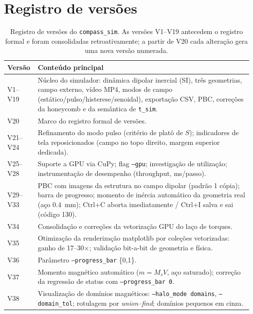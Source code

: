 \documentclass[11pt,a4paper]{article}
\newcommand{\code}[1]{\texttt{#1}}
\begin{document}
\section{Registro de versões}

\begin{table}[h]
\centering
\small
\caption{Registro de versões do \code{compass\_sim}. As versões V1--V19
antecedem o registro formal e foram consolidadas retroativamente; a
partir de V20 cada alteração gera uma nova versão numerada.}
\label{tab:versoes}
\begin{tabular}{@{}lp{11.5cm}@{}}
\toprule
\textbf{Versão} & \textbf{Conteúdo principal} \\
\midrule
V1--V19 & Núcleo do simulador: dinâmica dipolar inercial (SI), três
geometrias, campo externo, vídeo MP4, modos de campo
(estático/pulso/histerese/senoidal), exportação CSV, PBC, correções da
honeycomb e da semântica de \code{t\_sim}. \\
V20 & Marco do registro formal de versões. \\
V21--V24 & Refinamento do modo pulso (critério de platô de $S$);
indicadores de tela reposicionados (campo no topo direito, margem
superior dedicada). \\
V25--V28 & Suporte a GPU via CuPy; flag \code{--gpu}; investigação de
utilização; instrumentação de desempenho (throughput, ms/passo). \\
V29--V33 & PBC com imagens da estrutura no campo dipolar (padrão 1
cópia); barra de progresso; momento de inércia automático da geometria
real (aço \SI{0.4}{mm}); Ctrl+C aborta imediatamente / Ctrl+I salva e
sai (código 130). \\
V34 & Consolidação e correções da vetorização GPU do laço de torques. \\
V35 & Otimização da renderização matplotlib por coleções vetorizadas:
ganho de 17--30$\times$; validação bit-a-bit de geometria e física. \\
V36 & Parâmetro \code{--progress\_bar} \{0,1\}. \\
V37 & Momento magnético automático ($m = M_s V$, aço saturado);
correção da regressão de status com \code{--progress\_bar 0}. \\
V38 & Visualização de domínios magnéticos: \code{--halo\_mode domains},
\code{--domain\_tol}; rotulagem por \emph{union--find}; domínios pequenos
em cinza. \\

\end{tabular}
\end{table}
\end{document}
